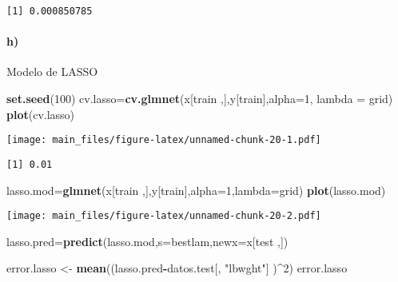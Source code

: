 \documentclass[]{article}
\newenvironment{Shaded}{\begin{snugshade}}{\end{snugshade}}
\newcommand{\KeywordTok}[1]{\textcolor[rgb]{0.13,0.29,0.53}{\textbf{#1}}}
\newcommand{\DataTypeTok}[1]{\textcolor[rgb]{0.13,0.29,0.53}{#1}}
\newcommand{\DecValTok}[1]{\textcolor[rgb]{0.00,0.00,0.81}{#1}}
\newcommand{\StringTok}[1]{\textcolor[rgb]{0.31,0.60,0.02}{#1}}
\newcommand{\OperatorTok}[1]{\textcolor[rgb]{0.81,0.36,0.00}{\textbf{#1}}}
\newcommand{\NormalTok}[1]{#1}
\let\oldparagraph\paragraph
\renewcommand{\paragraph}[1]{\oldparagraph{#1}\mbox{}}
\begin{document}
\begin{verbatim}
[1] 0.000850785
\end{verbatim}

\paragraph{h)}\label{h}

Modelo de LASSO

\begin{Shaded}
\begin{Highlighting}[]
\KeywordTok{set.seed}\NormalTok{(}\DecValTok{100}\NormalTok{)}
\NormalTok{cv.lasso=}\KeywordTok{cv.glmnet}\NormalTok{(x[train ,],y[train],}\DataTypeTok{alpha=}\DecValTok{1}\NormalTok{, }\DataTypeTok{lambda =}\NormalTok{ grid)}
\KeywordTok{plot}\NormalTok{(cv.lasso)}
\end{Highlighting}
\end{Shaded}

\texttt{[image: main\_files/figure-latex/unnamed-chunk-20-1.pdf]}

\begin{Shaded}
\end{Shaded}

\begin{verbatim}
[1] 0.01
\end{verbatim}

\begin{Shaded}
\begin{Highlighting}[]
\NormalTok{lasso.mod=}\KeywordTok{glmnet}\NormalTok{(x[train ,],y[train],}\DataTypeTok{alpha=}\DecValTok{1}\NormalTok{,}\DataTypeTok{lambda=}\NormalTok{grid)}
\KeywordTok{plot}\NormalTok{(lasso.mod)}
\end{Highlighting}
\end{Shaded}

\texttt{[image: main\_files/figure-latex/unnamed-chunk-20-2.pdf]}

\begin{Shaded}
\begin{Highlighting}[]
\NormalTok{lasso.pred=}\KeywordTok{predict}\NormalTok{(lasso.mod,}\DataTypeTok{s=}\NormalTok{bestlam,}\DataTypeTok{newx=}\NormalTok{x[test ,])}

\NormalTok{error.lasso <-}\StringTok{ }\KeywordTok{mean}\NormalTok{((lasso.pred}\OperatorTok{-}\NormalTok{datos.test[, }\StringTok{"lbwght"}\NormalTok{] )}\OperatorTok{^}\DecValTok{2}\NormalTok{)}
\NormalTok{error.lasso}
\end{Highlighting}
\end{Shaded}
\end{document}
